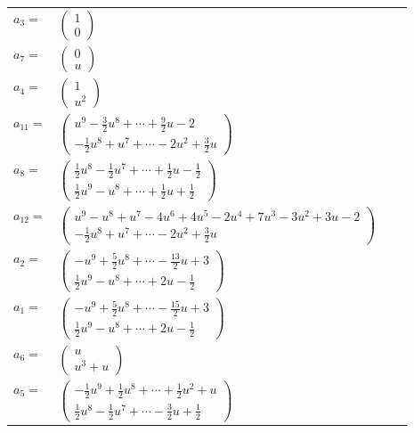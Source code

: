 \documentclass[1p]{elsarticle_modified}
\theoremstyle{definition}
\begin{document}
\begin{tabular}{m{7pt} m{180pt} m{7pt} m{180pt} }
\flushright $a_{3}=$&$\begin{pmatrix}1\\0\end{pmatrix}$ \\
\flushright $a_{7}=$&$\begin{pmatrix}0\\u\end{pmatrix}$ \\
\flushright $a_{4}=$&$\begin{pmatrix}1\\u^2\end{pmatrix}$ \\
\flushright $a_{11}=$&$\begin{pmatrix}u^9-\frac{3}{2} u^8+\cdots+\frac{9}{2} u-2\\-\frac{1}{2} u^8+u^7+\cdots-2 u^2+\frac{3}{2} u\end{pmatrix}$ \\
\flushright $a_{8}=$&$\begin{pmatrix}\frac{1}{2} u^8-\frac{1}{2} u^7+\cdots+\frac{1}{2} u-\frac{1}{2}\\\frac{1}{2} u^9- u^8+\cdots+\frac{1}{2} u+\frac{1}{2}\end{pmatrix}$ \\
\flushright $a_{12}=$&$\begin{pmatrix}u^9- u^8+u^7-4 u^6+4 u^5-2 u^4+7 u^3-3 u^2+3 u-2\\-\frac{1}{2} u^8+u^7+\cdots-2 u^2+\frac{3}{2} u\end{pmatrix}$ \\
\flushright $a_{2}=$&$\begin{pmatrix}- u^9+\frac{5}{2} u^8+\cdots-\frac{13}{2} u+3\\\frac{1}{2} u^9- u^8+\cdots+2 u-\frac{1}{2}\end{pmatrix}$ \\
\flushright $a_{1}=$&$\begin{pmatrix}- u^9+\frac{5}{2} u^8+\cdots-\frac{15}{2} u+3\\\frac{1}{2} u^9- u^8+\cdots+2 u-\frac{1}{2}\end{pmatrix}$ \\
\flushright $a_{6}=$&$\begin{pmatrix}u\\u^3+u\end{pmatrix}$ \\
\flushright $a_{5}=$&$\begin{pmatrix}-\frac{1}{2} u^9+\frac{1}{2} u^8+\cdots+\frac{1}{2} u^2+u\\\frac{1}{2} u^8-\frac{1}{2} u^7+\cdots-\frac{3}{2} u+\frac{1}{2}\end{pmatrix}$ \\

\end{tabular}
\end{document}
